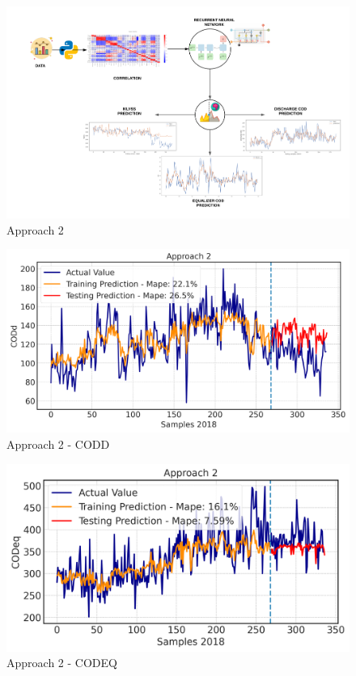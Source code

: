 \begin{figure}[h]
\centering
\includegraphics[width=\linewidth]{figures/Ch4/Approach2.png}
\caption{Approach 2}
\label{f:Approach 2}
\end{figure}

\begin{figure}[h]
\centering
\includegraphics[width=\linewidth]{figures/Ch6/CODd-2.png}
\caption{Approach 2 - CODD}
\label{f:App2-codd}
\end{figure}

\begin{figure}[h]
\centering
\includegraphics[width=\linewidth]{figures/Ch6/CODeq-2.png}
\caption{Approach 2 - CODEQ}
\label{f:App2-codeq}
\end{figure}

